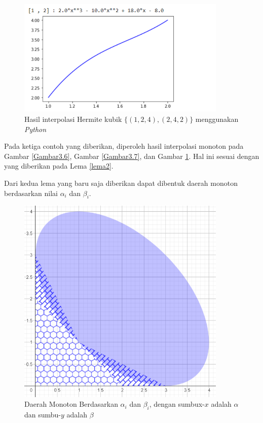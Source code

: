\begin{contoh}
     \begin{figure}[H]
         \centering
         \includegraphics[width=10cm]{Images/contohLema2.3Hermite.png}
         \caption{Hasil interpolasi Hermite kubik $\{(1,2,4),(2,4,2)\}$ menggunakan \textit{Python}}
         \label{Gambar3.8}
     \end{figure}

     Pada ketiga contoh yang diberikan, diperoleh hasil interpolasi monoton pada Gambar \ref{Gambar3.6}, Gambar \ref{Gambar3.7}, dan Gambar \ref{Gambar3.8}. Hal ini sesuai dengan yang diberikan pada Lema \ref{lema2}.
\end{contoh}

Dari kedua lema yang baru saja diberikan dapat dibentuk daerah monoton berdasarkan nilai $\alpha_i$ dan $\beta_i$.

\begin{figure}[H]
    \centering
    \includegraphics[width=10cm]{Images/Daerah monoton}
    \caption{Daerah Monoton Berdasarkan $\alpha_i$ dan $\beta_i$, dengan sumbux-$x$ adalah $\alpha$ dan sumbu-$y$ adalah $\beta$}
    \label{daerahmonoton}
\end{figure}

